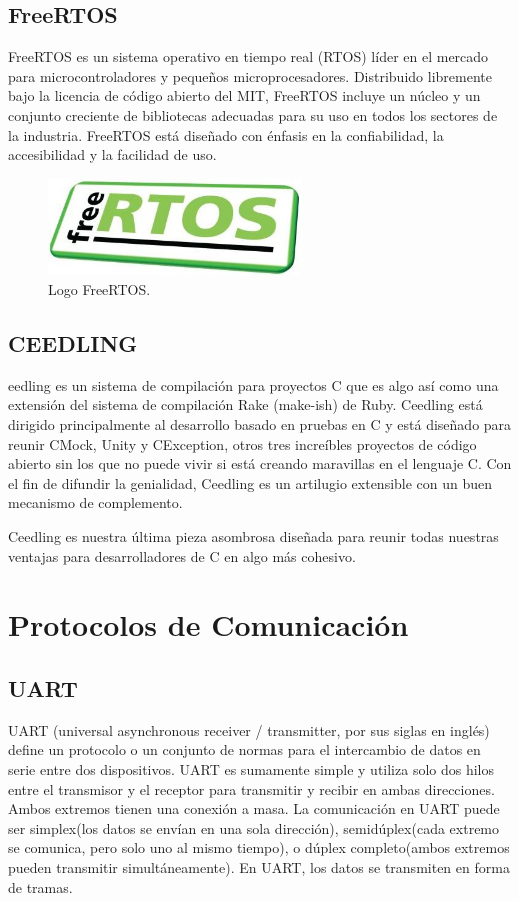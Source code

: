 \subsection{FreeRTOS}
\label{subsec:FreeRTOS}
FreeRTOS es un sistema operativo en tiempo real (RTOS) líder en el mercado para microcontroladores y pequeños microprocesadores. Distribuido libremente bajo la licencia de código abierto del MIT, FreeRTOS incluye un núcleo y un conjunto creciente de bibliotecas adecuadas para su uso en todos los sectores de la industria.
FreeRTOS está diseñado con énfasis en la confiabilidad, la accesibilidad y la facilidad de uso.
\begin{figure}[htbp]
	\centering
	\includegraphics[width=0.6\textwidth]{./Figures/logo_FreeRTOS.jpg}
	\caption{Logo FreeRTOS.}
	\label{fig:FreeRTOS}
\end{figure}
\subsection{CEEDLING}
eedling es un sistema de compilación para proyectos C que es algo así como una extensión del sistema de compilación Rake (make-ish) de Ruby. Ceedling está dirigido principalmente al desarrollo basado en pruebas en C y está diseñado para reunir CMock, Unity y CException, otros tres increíbles proyectos de código abierto sin los que no puede vivir si está creando maravillas en el lenguaje C. Con el fin de difundir la genialidad, Ceedling es un artilugio extensible con un buen mecanismo de complemento.

Ceedling es nuestra última pieza asombrosa diseñada para reunir todas nuestras ventajas para desarrolladores de C en algo más cohesivo.
\section{Protocolos de Comunicación}
\subsection{UART}
UART (universal asynchronous receiver / transmitter, por sus siglas en inglés) define un protocolo o un conjunto de normas para el intercambio de datos en serie entre dos dispositivos. UART es sumamente simple y utiliza solo dos hilos entre el transmisor y el receptor para transmitir y recibir en ambas direcciones. Ambos extremos tienen una conexión a masa. La comunicación en UART puede ser simplex(los datos se envían en una sola dirección), semidúplex(cada extremo se comunica, pero solo uno al mismo tiempo), o dúplex completo(ambos extremos pueden transmitir simultáneamente). En UART, los datos se transmiten en forma de tramas.
